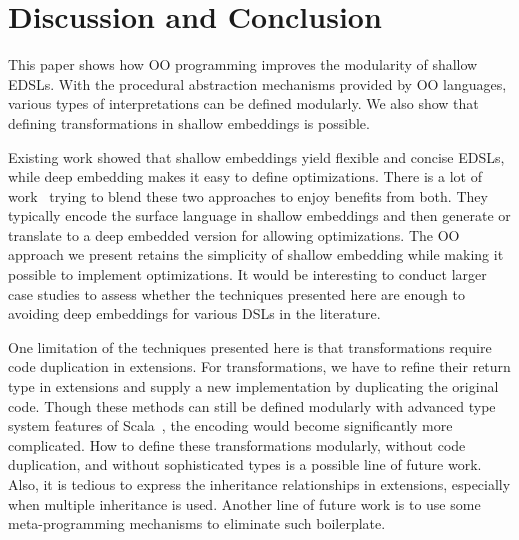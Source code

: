 \section{Discussion and Conclusion}
This paper shows how OO programming improves the modularity of shallow EDSLs.
With the procedural abstraction mechanisms provided by OO languages, various types of
interpretations can be defined modularly. We also show that defining
transformations in shallow embeddings is possible.


Existing work showed that shallow embeddings yield flexible and concise EDSLs, while deep embedding makes
it easy to define optimizations.
There is a lot of work~\cite{svenningsson2012combining,
  Jovanovic:2014:YCD:2658761.2658771, scherr2014implicit} trying to blend these two
approaches to enjoy benefits from both.
They typically encode the surface language in shallow embeddings and
then generate or translate to a deep embedded version for allowing optimizations.
The OO approach we present retains the simplicity of shallow embedding while
making it possible to implement optimizations. It would be interesting
to conduct larger case studies to assess whether the techniques
presented here are enough to avoiding deep embeddings for various DSLs
in the literature.

One limitation of the techniques presented here is that
transformations require code duplication in extensions.  For
transformations, we have to refine their return type in extensions and
supply a new implementation by duplicating the original code. 
Though these methods can still be defined modularly with advanced type
system features of Scala~\cite{zenger05independentlyextensible},
the encoding would become significantly more complicated.
How to define these transformations modularly, without code
duplication, and without sophisticated types
is a possible line of future work.  Also, it is tedious to
express the inheritance relationships in extensions, especially when
multiple inheritance is used. Another line of future work is to use
some meta-programming mechanisms to eliminate such boilerplate.
